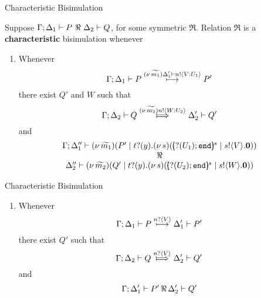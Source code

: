 \documentclass{beamer}
\begin{document}
	\begin{frame}{Characteristic Bisimulation}

		Suppose $\Gamma; \Delta_1 \proves P\ \Re\ \Delta_2 \proves Q$, for some symmetric $\Re$. Relation $\Re$ is a
		{\bf characteristic} bisimulation whenever
		\begin{enumerate}[$(\star)$]
			\item	Whenever
				\[
					\Gamma; \Delta_1 \vdash P \stackrel{(\nu\, \widetilde{m_1}) \Delta_1' \vdash n ! \langle V: U_1 \rangle}{\longmapsto} P'
				\]
				there exist $Q'$ and $W$ such that 
				\[
					\Gamma; \Delta_2 \proves Q \Hby{\news{\widetilde{m_2}} \bactout{n}{W: U_2}} \Delta_2' \proves Q'
				\]
				and
				\[
					\begin{array}{c}
						\Gamma; \Delta_1'' \proves \newsp{\widetilde{m_1}}{P' \Par \binp{t}{y}\newsp{s}{\mapchar{\btinp{U_1} \tinact}{s} \Par \bout{s}{V} \inact}}
						\\
						\Re
						\\
						\Delta_2'' \proves \newsp{\widetilde{m_2}}{Q' \Par \binp{t}{y}\newsp{s}{\mapchar{\btinp{U_2} \tinact}{s} \Par \bout{s}{W} \inact}}
					\end{array}
				\]
		\end{enumerate}
	\end{frame}

	\begin{frame}{Characteristic Bisimulation}

		\begin{enumerate}[$(\bullet)$]
			\item	Whenever
				\[
					\Gamma; \Delta_1 \vdash P \stackrel{n ? \langle V \rangle}{\longmapsto} \Delta_1' \vdash P'
				\]
				there exist $Q'$ such that 
				\[
					\Gamma; \Delta_2 \proves Q \Hby{\bactinp{n}{V}} \Delta_2' \proves Q'
				\]
				and
				\[
					\Gamma; \Delta_1' \vdash P'\, \Re\, \Delta_2' \vdash Q'
				\]
		\end{enumerate}
	\end{frame}
\end{document}
